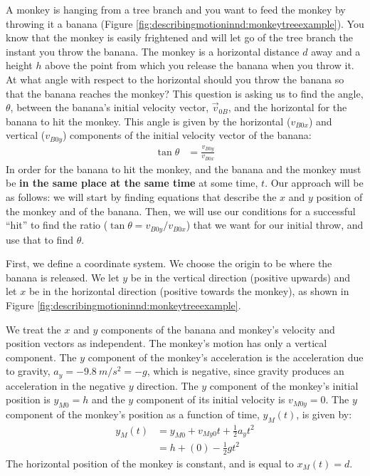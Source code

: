 \begin{example}{
A monkey is hanging from a tree branch and you want to feed the monkey by throwing it a banana (Figure \ref{fig:describingmotioninnd:monkeytreeexample}). You know that the monkey is easily frightened and will let go of the tree branch the instant you throw the banana. The monkey is a horizontal distance $d$ away and a height $h$ above the point from which you release the banana when you throw it. At what angle with respect to the horizontal should you throw the banana so that the banana reaches the monkey? 
}
This question is asking us to find the angle, $\theta$, between the banana's initial velocity vector, $\vec v_{0B}$, and the horizontal for the banana to hit the monkey. This angle is given by the horizontal ($v_{B0x}$) and vertical ($v_{B0y}$) components of the initial velocity vector of the banana:
\begin{align*}
\tan\theta&=\frac{v_{B0y}}{v_{B0x}}
\end{align*}
In order for the banana to hit the monkey, and the banana and the monkey must be \textbf{in the same place at the same time} at some time, $t$. Our approach will be as follows: we will start by finding equations that describe the $x$ and $y$ position of the monkey and of the banana. Then, we will use our conditions for a successful ``hit'' to find the ratio ($\tan\theta=v_{B0y}/v_{B0x}$) that we want for our initial throw, and use that to find $\theta$.

First, we define a coordinate system. We choose the origin to be where the banana is released. We let $y$ be in the vertical direction (positive upwards) and let $x$ be in the horizontal direction (positive towards the monkey), as shown in Figure \ref{fig:describingmotioninnd:monkeytreeexample}. 

We treat the $x$ and $y$ components of the banana and monkey's velocity and position vectors as independent. The monkey's motion has only a vertical component. The $y$ component of the monkey's acceleration is the acceleration due to gravity, $a_y=-\SI{9.8}{m/s^2}= -g$, which is negative, since gravity produces an acceleration in the negative $y$ direction. The $y$ component of the monkey's initial position is $y_{M0}=h$ and the $y$ component of its initial velocity is $v_{M0y}=0$. The $y$ component of the monkey's position as a function of time, $y_M(t)$, is given by:
\begin{align*}
y_M(t)&=y_{M0}+v_{My0}t+\frac{1}{2}a_yt^2\\
&=h+(0)-\frac{1}{2}gt^2
\end{align*}
The horizontal position of the monkey is constant, and is equal to $x_M(t)=d$.


\end{example}
